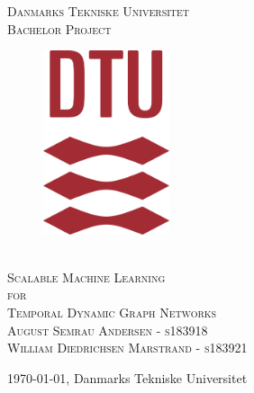 \documentclass{article}
\begin{document}
\begin{titlepage}
\center %
\textsc{\LARGE Danmarks Tekniske Universitet}
\\[1cm]
\textsc{\huge{Bachelor Project}}
\\[1cm]
\begin{figure}[H]
    \centering
    \includegraphics[width=10em]{dtu_logo.png}
\end{figure}
\\[2cm]
\textsc{\huge{Scalable Machine Learning}}
\\[0.5cm] 
\textsc{\huge{for}}
\\[0.5cm] 
\textsc{\huge{Temporal Dynamic Graph Networks}}
\\[1.0cm]
\textsc{August Semrau Andersen - s183918
\\ William Diedrichsen Marstrand - s183921} 
\\[10pt]

\medskip
\null
\vfill
\vspace{0.5cm}
\begin{center}
\today,
 Danmarks Tekniske Universitet\\
\end{center}
\end{titlepage}


\newpage
{}




\newpage
{}

\tableofcontents
\clearpage


\clearpage
\end{document}
